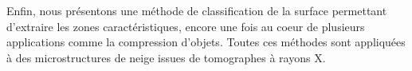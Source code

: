 Enfin, nous présentons une méthode de classification de la surface permettant
d’extraire les zones caractéristiques, encore une fois au coeur de plusieurs
applications comme la compression d’objets. Toutes ces méthodes sont appliquées à
des microstructures de neige issues de tomographes à rayons X.
